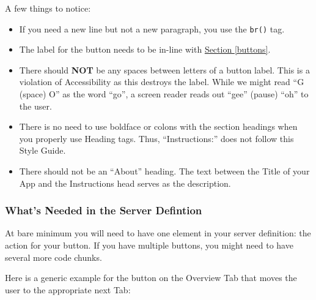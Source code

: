 \documentclass[
]{book}
\newenvironment{Shaded}{\begin{snugshade}}{\end{snugshade}}
\newcommand{\CommentTok}[1]{\textcolor[rgb]{0.56,0.35,0.01}{\textit{#1}}}
\newcommand{\DataTypeTok}[1]{\textcolor[rgb]{0.13,0.29,0.53}{#1}}
\newcommand{\KeywordTok}[1]{\textcolor[rgb]{0.13,0.29,0.53}{\textbf{#1}}}
\newcommand{\NormalTok}[1]{#1}
\newcommand{\OperatorTok}[1]{\textcolor[rgb]{0.81,0.36,0.00}{\textbf{#1}}}
\newcommand{\StringTok}[1]{\textcolor[rgb]{0.31,0.60,0.02}{#1}}
\providecommand{\tightlist}{%
  \setlength{\itemsep}{0pt}\setlength{\parskip}{0pt}}
\begin{document}
A few things to notice:

\begin{itemize}
\tightlist
\item
  If you need a new line but not a new paragraph, you use the \texttt{br()} tag.
\item
  The label for the button needs to be in-line with \protect\hyperlink{buttons}{Section \ref{buttons}}.
\item
  There should \textbf{NOT} be any spaces between letters of a button label. This is a violation of Accessibility as this destroys the label. While we might read ``G (space) O'' as the word ``go'', a screen reader reads out ``gee'' (pause) ``oh'' to the user.
\item
  There is no need to use boldface or colons with the section headings when you properly use Heading tags. Thus, ``Instructions:'' does not follow this Style Guide.
\item
  There should not be an ``About'' heading. The text between the Title of your App and the Instructions head serves as the description.
\end{itemize}

\hypertarget{whats-needed-in-the-server-defintion}{%
\subsubsection{What's Needed in the Server Defintion}\label{whats-needed-in-the-server-defintion}}

At bare minimum you will need to have one element in your server definition: the action for your button. If you have multiple buttons, you might need to have several more code chunks.

Here is a generic example for the button on the Overview Tab that moves the user to the appropriate next Tab:

\begin{Shaded}
\end{Shaded}
\end{document}
